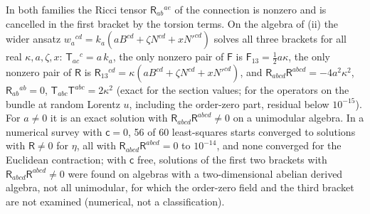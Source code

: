In both families the Ricci tensor \(\mathsf R_{ab}{}^{ae}\) of the connection is nonzero and is cancelled in the first bracket by the torsion terms. On the algebra of (ii) the wider ansatz \(w_a{}^{cd}=k_a(aB^{cd}+\zeta N^{cd}+xN'^{cd})\) solves all three brackets for all real \(\kappa,a,\zeta,x\): \(\mathsf T_{ac}{}^c=a\,k_a\), the only nonzero pair of \(\mathsf F\) is \(\mathsf F_{13}=\tfrac12a\kappa\), the only nonzero pair of \(\mathsf R\) is \(\mathsf R_{13}{}^{cd}=\kappa(aB^{cd}+\zeta N^{cd}+xN'^{cd})\), and \(\mathsf R_{abcd}\mathsf R^{abcd}=-4a^2\kappa^2\), \(\mathsf R_{ab}{}^{ab}=0\), \(\mathsf T_{abc}\mathsf T^{abc}=2\kappa^2\) (exact for the section values; for the operators on the bundle at random Lorentz \(u\), including the order-zero part, residual below \(10^{-15}\)). For \(a\neq0\) it is an exact solution with \(\mathsf R_{abcd}\mathsf R^{abcd}\neq0\) on a unimodular algebra. In a numerical survey with \(\mathsf c=0\), 56 of 60 least-squares starts converged to solutions with \(\mathsf R\neq0\) for \(\eta\), all with \(\mathsf R_{abcd}\mathsf R^{abcd}=0\) to \(10^{-14}\), and none converged for the Euclidean contraction; with \(\mathsf c\) free, solutions of the first two brackets with \(\mathsf R_{abcd}\mathsf R^{abcd}\neq0\) were found on algebras with a two-dimensional abelian derived algebra, not all unimodular, for which the order-zero field and the third bracket are not examined (numerical, not a classification).

